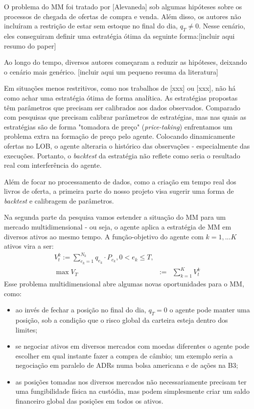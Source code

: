 O problema do MM foi tratado por [Alevaneda] sob algumas hipóteses sobre os processos de chegada de ofertas de compra e venda. Além disso, os autores não incluíram a restrição de estar sem estoque no final do dia, $q_T \neq 0$.
Nesse cenário, eles conseguiram definir uma estratégia ótima da seguinte forma:[incluir aqui resumo do paper]

Ao longo do tempo, diversos autores começaram a reduzir as hipóteses, deixando o cenário mais genérico.
[incluir aqui um pequeno resuma da literatura]


Em situações menos restritivos, como nos trabalhos de [xxx] ou [xxx], não há como achar uma estratégia ótima de forma analítica. As estratégias propostas têm parâmetros que precisam ser calibrados aos dados observados. 
Comparado com pesquisas que precisam calibrar parâmetros de estratégias, mas nas quais as estratégias são de forma "tomadora de preço" (\textit{price-taking}) enfrentamos um problema extra na formação de preço pelo agente.
Colocando dinamicamente ofertas no LOB, o agente alteraria o histórico das observações - especialmente das execuções. Portanto, o \textit{backtest} da estratégia não reflete como seria o resultado real com interferência do agente.

Além de focar no processamento de dados, como a criação em tempo real dos livros de oferta, a primeira parte do nosso projeto visa sugerir uma forma de \textit{backtest} e calibragem de parâmetros.

Na segunda parte da pesquisa vamos estender a situação do MM para um mercado multidimensional - ou seja, o agente aplica a estratégia de MM em diversos ativos ao mesmo tempo. A função-objetivo do agente com $k=1,...K$ ativos vira a ser:
\begin{eqnarray*}
    V_t^k := \sum_{e_k=1}^{N_k} q_{e_k} \cdot P_{e_k}, 0<e_k\leq T, \\
    \max V_T &:=&\sum_{k=1}^K   V_t^k
\end{eqnarray*}
Esse problema multidimensional abre algumas novas oportunidades para o MM, como:
\begin{itemize}
    \item ao invés de fechar a posição no final do dia, $q_T=0$ o agente pode manter uma posição, sob a condição que o risco global da carteira esteja dentro dos limites;
    \item se negociar ativos em diversos mercados com moedas diferentes o agente pode escolher em qual instante fazer a compra de câmbio; um exemplo seria a negociação em paralelo de ADRs numa bolsa americana e de ações na B3;
    \item as posições tomadas nos diversos mercados não necessariamente precisam ter uma fungibilidade física na custódia, mas podem simplesmente criar um saldo financeiro global das posições em todos os ativos.
\end{itemize}
